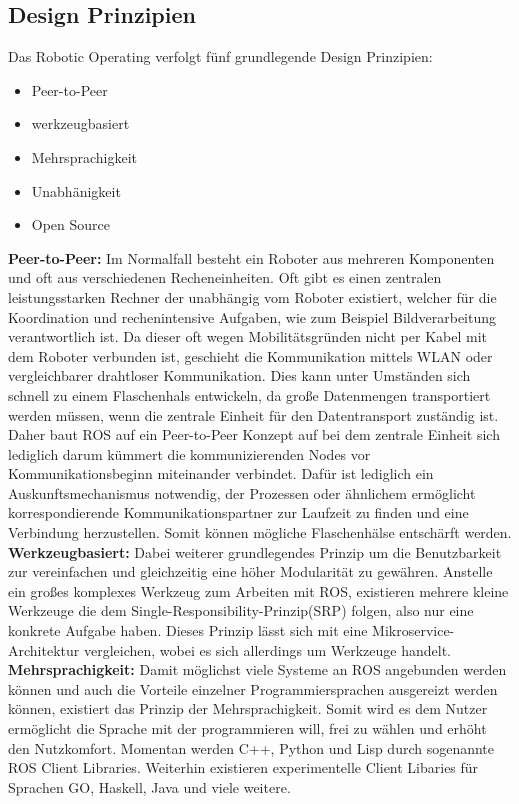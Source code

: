 \subsection{Design Prinzipien}
Das Robotic Operating verfolgt fünf grundlegende Design Prinzipien: 
\begin{itemize}
	\item Peer-to-Peer
	\item werkzeugbasiert
	\item Mehrsprachigkeit
	\item Unabhänigkeit
	\item Open Source
\end{itemize}
\textbf{Peer-to-Peer:} Im Normalfall besteht ein Roboter aus mehreren Komponenten und oft aus verschiedenen Recheneinheiten. Oft gibt es einen zentralen leistungsstarken Rechner der unabhängig vom Roboter existiert, welcher für die Koordination und rechenintensive Aufgaben, wie zum Beispiel Bildverarbeitung verantwortlich ist. Da dieser oft wegen Mobilitätsgründen nicht per Kabel mit dem Roboter verbunden ist, geschieht die Kommunikation mittels WLAN oder vergleichbarer drahtloser Kommunikation. Dies kann unter Umständen sich schnell zu einem Flaschenhals entwickeln, da große Datenmengen transportiert werden müssen, wenn die zentrale Einheit für den Datentransport zuständig ist. Daher baut ROS auf ein Peer-to-Peer Konzept auf bei dem zentrale Einheit sich lediglich darum kümmert die kommunizierenden Nodes vor Kommunikationsbeginn miteinander verbindet. Dafür ist lediglich ein Auskunftsmechanismus notwendig, der Prozessen oder ähnlichem ermöglicht korrespondierende Kommunikationspartner zur Laufzeit zu finden und eine Verbindung herzustellen. Somit können mögliche Flaschenhälse entschärft werden.\newline
\textbf{Werkzeugbasiert:} Dabei weiterer grundlegendes Prinzip um die Benutzbarkeit zur vereinfachen und gleichzeitig eine höher Modularität zu gewähren. Anstelle ein großes komplexes Werkzeug zum Arbeiten mit ROS, existieren mehrere kleine Werkzeuge die dem Single-Responsibility-Prinzip(SRP) folgen, also nur eine konkrete Aufgabe haben. Dieses Prinzip lässt sich mit eine Mikroservice-Architektur vergleichen, wobei es sich allerdings um Werkzeuge handelt.
\newline
\textbf{Mehrsprachigkeit:} Damit möglichst viele Systeme an ROS angebunden werden können und auch die Vorteile einzelner Programmiersprachen ausgereizt werden können, existiert das Prinzip der Mehrsprachigkeit. Somit wird es dem Nutzer ermöglicht die Sprache mit der programmieren will, frei zu wählen und erhöht den Nutzkomfort. Momentan werden C++, Python und Lisp durch sogenannte ROS Client Libraries. Weiterhin existieren experimentelle Client Libaries für Sprachen GO, Haskell, Java und viele weitere.
